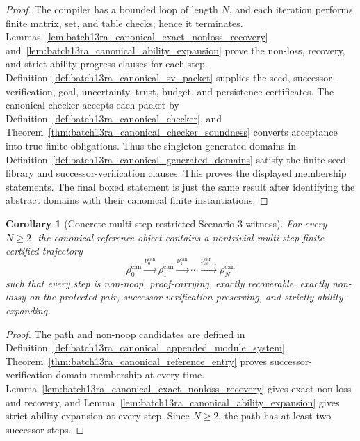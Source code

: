 \documentclass[11pt]{article}
\newtheorem{corollary}[theorem]{Corollary}
\newcommand{\1}{\mathbf{1}}
\begin{document}
\begin{proof}
The compiler has a bounded loop of length \(N\), and each iteration performs finite matrix, set, and table checks; hence it terminates.  Lemmas~\ref{lem:batch13ra_canonical_exact_nonloss_recovery} and~\ref{lem:batch13ra_canonical_ability_expansion} prove the non-loss, recovery, and strict ability-progress clauses for each step.  Definition~\ref{def:batch13ra_canonical_sv_packet} supplies the seed, successor-verification, goal, uncertainty, trust, budget, and persistence certificates.  The canonical checker accepts each packet by Definition~\ref{def:batch13ra_canonical_checker}, and Theorem~\ref{thm:batch13ra_canonical_checker_soundness} converts acceptance into true finite obligations.  Thus the singleton generated domains in Definition~\ref{def:batch13ra_canonical_generated_domains} satisfy the finite seed-library and successor-verification clauses.  This proves the displayed membership statements.  The final boxed statement is just the same result after identifying the abstract domains with their canonical finite instantiations.
\end{proof}

\begin{corollary}[Concrete multi-step restricted-Scenario-3 witness]
\label{cor:batch13ra_concrete_multistep_witness}
For every \(N\ge2\), the canonical reference object contains a nontrivial multi-step finite certified trajectory
\[
\rho_0^{\mathrm{can}}
\xrightarrow{\nu_0^{\mathrm{can}}}
\rho_1^{\mathrm{can}}
\xrightarrow{\nu_1^{\mathrm{can}}}
\cdots
\xrightarrow{\nu_{N-1}^{\mathrm{can}}}
\rho_N^{\mathrm{can}}
\]
such that every step is non-noop, proof-carrying, exactly recoverable, exactly non-lossy on the protected pair, successor-verification-preserving, and strictly ability-expanding.
\end{corollary}

\begin{proof}
The path and non-noop candidates are defined in Definition~\ref{def:batch13ra_canonical_appended_module_system}.  Theorem~\ref{thm:batch13ra_canonical_reference_entry} proves successor-verification domain membership at every time.  Lemma~\ref{lem:batch13ra_canonical_exact_nonloss_recovery} gives exact non-loss and recovery, and Lemma~\ref{lem:batch13ra_canonical_ability_expansion} gives strict ability expansion at every step.  Since \(N\ge2\), the path has at least two successor steps.
\end{proof}
\end{document}
